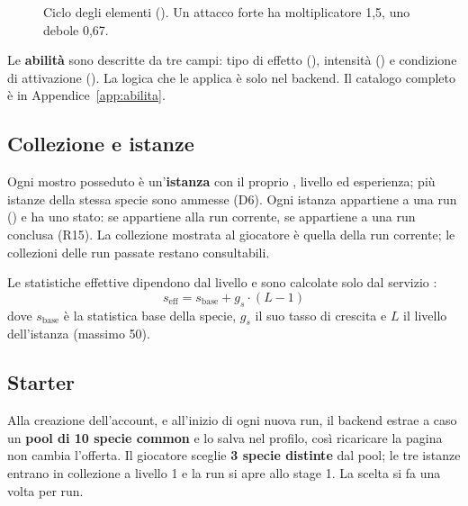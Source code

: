 \documentclass[11pt,a4paper]{article}
\newcommand{\codec}[1]{\texttt{\detokenize{#1}}}
\begin{document}
\begin{figure}[htbp]
  \centering
  \caption{Ciclo degli elementi (\codec{elements.json}). Un attacco forte ha moltiplicatore 1,5, uno debole 0,67.}
  \label{fig:elementi}
\end{figure}

Le \textbf{abilità} sono descritte da tre campi: tipo di effetto (), intensità () e condizione di attivazione (). La logica che le applica è solo nel backend. Il catalogo completo è in Appendice~\ref{app:abilita}.

\subsection{Collezione e istanze}

Ogni mostro posseduto è un'\textbf{istanza} con il proprio , livello ed esperienza; più istanze della stessa specie sono ammesse (D6). Ogni istanza appartiene a una run () e ha uno stato:  se appartiene alla run corrente,  se appartiene a una run conclusa (R15). La collezione mostrata al giocatore è quella della run corrente; le collezioni delle run passate restano consultabili.

Le statistiche effettive dipendono dal livello e sono calcolate solo dal servizio :
\[
  s_{\text{eff}} = s_{\text{base}} + g_s \cdot (L - 1)
\]
dove $s_{\text{base}}$ è la statistica base della specie, $g_s$ il suo tasso di crescita e $L$ il livello dell'istanza (massimo 50).

\subsection{Starter}

Alla creazione dell'account, e all'inizio di ogni nuova run, il backend estrae a caso un \textbf{pool di 10 specie common} e lo salva nel profilo, così ricaricare la pagina non cambia l'offerta. Il giocatore sceglie \textbf{3 specie distinte} dal pool; le tre istanze entrano in collezione a livello 1 e la run si apre allo stage 1. La scelta si fa una volta per run.
\end{document}
